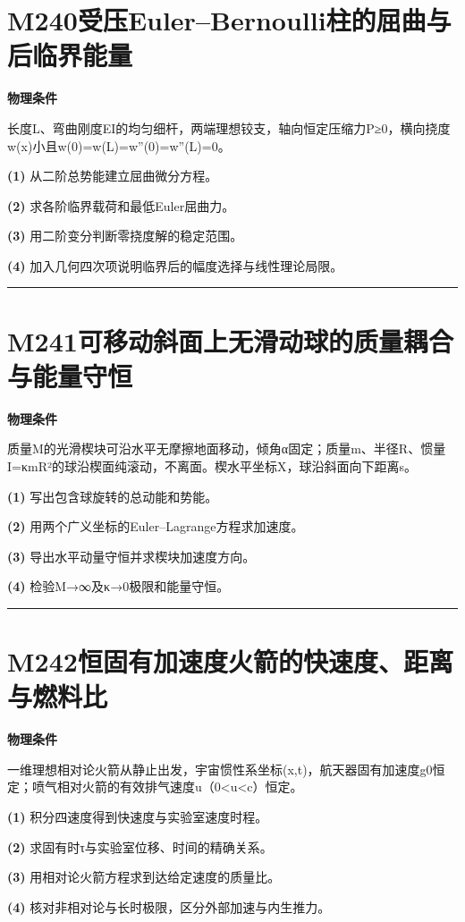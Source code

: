 \documentclass[UTF8,a4paper,11pt,oneside,openany]{ctexbook}
\begin{document}
\section*{M240\quad 受压Euler–Bernoulli柱的屈曲与后临界能量}
\textbf{物理条件}\par 长度L、弯曲刚度EI的均匀细杆，两端理想铰支，轴向恒定压缩力P≥0，横向挠度w(x)小且w(0)=w(L)=w''(0)=w''(L)=0。
\par\noindent\textbf{(1)} 从二阶总势能建立屈曲微分方程。
\par\noindent\textbf{(2)} 求各阶临界载荷和最低Euler屈曲力。
\par\noindent\textbf{(3)} 用二阶变分判断零挠度解的稳定范围。
\par\noindent\textbf{(4)} 加入几何四次项说明临界后的幅度选择与线性理论局限。

\par\bigskip\hrule\bigskip
\section*{M241\quad 可移动斜面上无滑动球的质量耦合与能量守恒}
\textbf{物理条件}\par 质量M的光滑楔块可沿水平无摩擦地面移动，倾角α固定；质量m、半径R、惯量I=κmR²的球沿楔面纯滚动，不离面。楔水平坐标X，球沿斜面向下距离s。
\par\noindent\textbf{(1)} 写出包含球旋转的总动能和势能。
\par\noindent\textbf{(2)} 用两个广义坐标的Euler–Lagrange方程求加速度。
\par\noindent\textbf{(3)} 导出水平动量守恒并求楔块加速度方向。
\par\noindent\textbf{(4)} 检验M→∞及κ→0极限和能量守恒。

\par\bigskip\hrule\bigskip
\section*{M242\quad 恒固有加速度火箭的快速度、距离与燃料比}
\textbf{物理条件}\par 一维理想相对论火箭从静止出发，宇宙惯性系坐标(x,t)，航天器固有加速度g0恒定；喷气相对火箭的有效排气速度u（0<u<c）恒定。
\par\noindent\textbf{(1)} 积分四速度得到快速度与实验室速度时程。
\par\noindent\textbf{(2)} 求固有时τ与实验室位移、时间的精确关系。
\par\noindent\textbf{(3)} 用相对论火箭方程求到达给定速度的质量比。
\par\noindent\textbf{(4)} 核对非相对论与长时极限，区分外部加速与内生推力。
\end{document}
